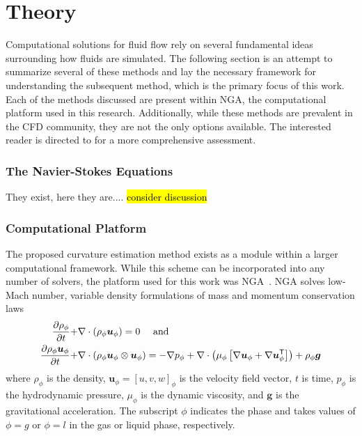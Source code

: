 \chapter{Theory} \label{CH:theory}
Computational solutions for fluid flow rely on several fundamental ideas surrounding how fluids are simulated. The following section is an attempt to summarize several of these methods and lay the necessary framework for understanding the subsequent method, which is the primary focus of this work. Each of the methods discussed are present within NGA, the computational platform used in this research. Additionally, while these methods are prevalent in the CFD community, they are not the only options available. The interested reader is directed to \cite{TRYG} for a more comprehensive assessment.   

\subsection{The Navier-Stokes Equations}
They exist, here they are....
\hl{consider discussion}

\subsection{Computational Platform}
The proposed curvature estimation method exists as a module within a larger computational framework. While this scheme can be incorporated into any number of solvers, the platform used for this work was NGA~\cite{NGA1,NGA2}.  NGA solves low-Mach number, variable density formulations of mass and momentum conservation laws
\begin{align}
\frac{\partial \rho_\phi}{\partial t} +& \nabla \cdot \left(\rho_\phi\mbox{\boldmath{$u$}}_\phi\right) = 0\mbox{ \quad and}\\
\frac{\partial \rho_\phi \mbox{\boldmath{$u$}}_\phi}{\partial t} +& \nabla \cdot \left(\rho_\phi\mbox{\boldmath{$u$}}_\phi\otimes\mbox{\boldmath{$u$}}_\phi\right) = -\nabla p_\phi + \nabla\cdot\left(\mu_\phi\left[\nabla\mbox{\boldmath{$u$}}_\phi+\nabla\mbox{\boldmath{$u$}}_\phi^\mathsf{T}\right]\right)+\rho_\phi\mbox{\boldmath{$g$}}
\end{align}
where
$\rho_\phi$ is the density,
$\bm{u}_\phi=[u,v,w]_\phi$ is the velocity field vector,
$t$ is time,
$p_\phi$ is the hydrodynamic pressure,
$\mu_\phi$ is the dynamic viscosity, and
$\bm{g}$ is the gravitational acceleration.
The subscript
$\phi$ indicates the phase and takes values of $\phi=g$ or
$\phi=l$ in the gas or liquid phase, respectively.

